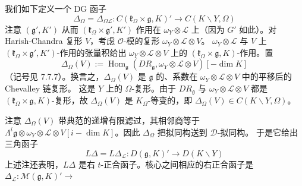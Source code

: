我们如下定义一个 DG 函子
\begin{equation}\tag{336}
\Delta_\Omega=\Delta_{\Omega\mathcal{L}}:
C(\mathfrak{k}_\Omega\times\mathfrak{g},K)'\longrightarrow
C(K\backslash Y,\Omega)
\end{equation}
注意 $(\mathfrak{g}',K')$ 从而
$(\mathfrak{k}_\Omega\times\mathfrak{g}',K')$ 作用在
$\omega_Y\otimes\mathcal{L}$ 上（因为 $G'$ 如此）。对 Harish-Chandra
复形 $V$，考虑 $\mathcal{O}$-模的复形
$\omega_Y\otimes\mathcal{L}\otimes V$。
$\omega_Y\otimes\mathcal{L}$ 与 $V$ 上
$(\mathfrak{k}_\Omega\times\mathfrak{g}',K')$-作用的张量积给出
$\omega_Y\otimes\mathcal{L}\otimes V$ 上的
$(\mathfrak{k}_\Omega\times\mathfrak{g},K)$-作用。置
\[
\Delta_\Omega(V):=\operatorname{Hom}_{\mathfrak{g}}
(DR_{\mathfrak{g}},\omega_Y\otimes\mathcal{L}\otimes V)[-\dim K]
\]
（记号见 7.7.7）。换言之，$\Delta_\Omega(V)$ 是 $\mathfrak{g}$ 的、系数在
$\omega_Y\otimes\mathcal{L}\otimes V$ 中的平移后的 Chevalley 链复形。
这是 $Y$ 上的 $\Omega$-复形。由于 $DR_{\mathfrak{g}}$ 与
$\omega_Y\otimes\mathcal{L}\otimes V$ 都是
$(\mathfrak{k}_\Omega\times\mathfrak{g},K)$-复形，故
$\Delta_\Omega(V)$ 是 $K_\Omega$-等变的，即
$\Delta_\Omega(V)\in C(K\backslash Y,\Omega)$。

注意 $\Delta_\Omega(V)$ 带典范的递增有限滤过，其相邻商等于
$\Lambda^i\mathfrak{g}\otimes\omega_Y\otimes\mathcal{L}\otimes V
[i-\dim K]$。因此 $\Delta_\Omega$ 把拟同构送到 $\mathcal{D}$-拟同构。
于是它给出三角函子
\begin{equation}\tag{337}
L\Delta=L\Delta_{\mathcal{L}}:
D(\mathfrak{g},K)'\longrightarrow D(K\backslash Y)
\end{equation}
上述注还表明，$L\Delta$ 是右 $t$-正合函子。核心之间相应的右正合函子是
$\Delta_{\mathcal{L}}:\mathcal{M}(\mathfrak{g},K)'\to$
